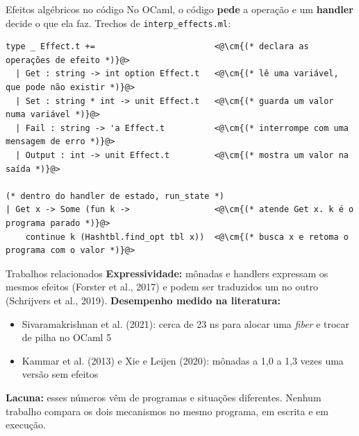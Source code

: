 \documentclass[aspectratio=169,10pt,xcolor={table}]{beamer}
\newcommand{\cm}[1]{\textcolor{comentario}{\itshape #1}}
\begin{document}
\begin{frame}[fragile]{Efeitos algébricos no código}
  No OCaml, o código \textbf{pede} a operação e um \textbf{handler} decide o que ela faz. Trechos de \texttt{interp\_effects.ml}:
  \vskip3mm
\begin{lstlisting}[language=OCamlTCC]
type _ Effect.t +=                        <@\cm{(* declara as operações de efeito *)}@>
  | Get : string -> int option Effect.t   <@\cm{(* lê uma variável, que pode não existir *)}@>
  | Set : string * int -> unit Effect.t   <@\cm{(* guarda um valor numa variável *)}@>
  | Fail : string -> 'a Effect.t          <@\cm{(* interrompe com uma mensagem de erro *)}@>
  | Output : int -> unit Effect.t         <@\cm{(* mostra um valor na saída *)}@>

(* dentro do handler de estado, run_state *)
| Get x -> Some (fun k ->                 <@\cm{(* atende Get x. k é o programa parado *)}@>
    continue k (Hashtbl.find_opt tbl x))  <@\cm{(* busca x e retoma o programa com o valor *)}@>
\end{lstlisting}
\end{frame}

\begin{frame}{Trabalhos relacionados}
  \textbf{Expressividade:} mônadas e handlers expressam os mesmos efeitos
  (Forster et al., 2017) e podem ser traduzidos um no outro (Schrijvers et al., 2019).
  \vskip3.5mm
  \textbf{Desempenho medido na literatura:}
  \begin{itemize}
    \item Sivaramakrishnan et al. (2021): cerca de 23 ns para alocar uma \emph{fiber} e trocar de pilha no OCaml 5
    \item Kammar et al. (2013) e Xie e Leijen (2020): mônadas a 1,0 a 1,3 vezes uma versão sem efeitos
  \end{itemize}
  \vskip3.5mm
  \textbf{Lacuna:} esses números vêm de programas e situações diferentes. Nenhum
  trabalho compara os dois mecanismos no mesmo programa, em escrita e em execução.
\end{frame}
\end{document}
